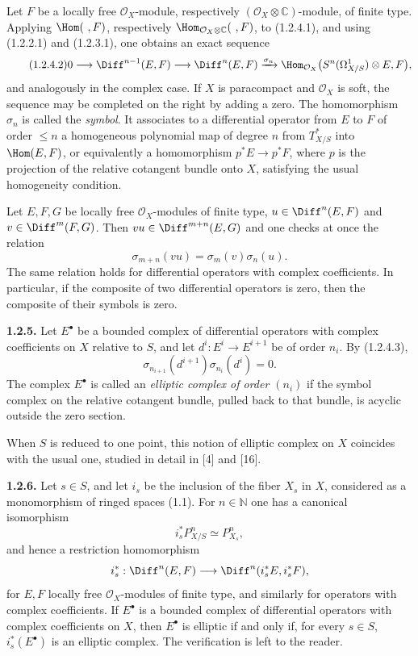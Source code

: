 \documentclass[11pt]{article}
\begin{document}
Let $F$ be a locally free $\mathcal O_X$-module, respectively $(\mathcal O_X\otimes\mathbb C)$-module, of finite type. Applying $\Hom(\ ,F)$, respectively $\Hom_{\mathcal O_X\otimes\mathbb C}(\ ,F)$, to (1.2.4.1), and using (1.2.2.1) and (1.2.3.1), one obtains an exact sequence
\begin{equation}\tag{1.2.4.2}
0\longrightarrow \Diff^{n-1}(E,F)\longrightarrow \Diff^n(E,F)
\xrightarrow{\sigma_n}
\Hom_{\mathcal O_X}\bigl(S^n(\Omega^1_{X/S})\otimes E,F\bigr),
\end{equation}
and analogously in the complex case. If $X$ is paracompact and $\mathcal O_X$ is soft, the sequence may be completed on the right by adding a zero. The homomorphism $\sigma_n$ is called the \emph{symbol}. It associates to a differential operator from $E$ to $F$ of order $\le n$ a homogeneous polynomial map of degree $n$ from $T^*_{X/S}$ into $\Hom(E,F)$, or equivalently a homomorphism $p^*E\to p^*F$, where $p$ is the projection of the relative cotangent bundle onto $X$, satisfying the usual homogeneity condition.

Let $E,F,G$ be locally free $\mathcal O_X$-modules of finite type, $u\in\Diff^n(E,F)$ and $v\in\Diff^m(F,G)$. Then $vu\in\Diff^{m+n}(E,G)$ and one checks at once the relation
\begin{equation}\tag{1.2.4.3}
 \sigma_{m+n}(vu)=\sigma_m(v)\sigma_n(u).
\end{equation}
The same relation holds for differential operators with complex coefficients. In particular, if the composite of two differential operators is zero, then the composite of their symbols is zero.

\textbf{1.2.5.} Let $E^\bullet$ be a bounded complex of differential operators with complex coefficients on $X$ relative to $S$, and let $d^i:E^i\to E^{i+1}$ be of order $n_i$. By (1.2.4.3),
\[
 \sigma_{n_{i+1}}(d^{i+1})\sigma_{n_i}(d^i)=0.
\]
The complex $E^\bullet$ is called an \emph{elliptic complex of order $(n_i)$} if the symbol complex on the relative cotangent bundle, pulled back to that bundle, is acyclic outside the zero section.

When $S$ is reduced to one point, this notion of elliptic complex on $X$ coincides with the usual one, studied in detail in [4] and [16].

\textbf{1.2.6.} Let $s\in S$, and let $i_s$ be the inclusion of the fiber $X_s$ in $X$, considered as a monomorphism of ringed spaces (1.1). For $n\in\mathbb N$ one has a canonical isomorphism
\[
 i_s^*P^n_{X/S}\simeq P^n_{X_s},
\]
and hence a restriction homomorphism
\[
 i_s^*:\Diff^n(E,F)\longrightarrow \Diff^n(i_s^*E,i_s^*F),
\]
for $E,F$ locally free $\mathcal O_X$-modules of finite type, and similarly for operators with complex coefficients. If $E^\bullet$ is a bounded complex of differential operators with complex coefficients on $X$, then $E^\bullet$ is elliptic if and only if, for every $s\in S$, $i_s^*(E^\bullet)$ is an elliptic complex. The verification is left to the reader.
\end{document}
